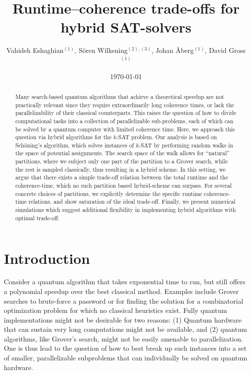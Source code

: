 \documentclass[a4paper,aps,floatfix]{revtex4}
\begin{document}
\title{Runtime--coherence trade-offs for hybrid SAT-solvers}


\author{
	Vahideh Eshaghian$^{(1)}$, 
S\"oren Wilkening$^{(2), (3)}$, Johan {\AA}berg$^{(1)}$, David Gross$^{(1)}$
}



\date{\today}


\begin{abstract}
	Many search-based quantum algorithms that achieve a theoretical speedup are not practically relevant since they require extraordinarily long coherence times, or lack the parallelizability of their classical counterparts. 
	This raises the question of how to divide computational tasks into  a collection of parallelizable sub-problems, each of which can be solved by a quantum computer with limited coherence time. 
	Here, we approach this question via hybrid algorithms for the $k$-SAT problem. 
	Our analysis is based on Sch\"oning's algorithm, which solves instances of $k$-SAT by performing random walks in the space of potential assignments. 
	The search space of the walk allows for ``natural'' partitions, where we subject only one part of the partition to a Grover search, while the rest is sampled classically, thus resulting in a hybrid scheme. 
	In this setting, we argue that there exists a simple trade-off relation between the total runtime and the coherence-time, which no such partition based hybrid-scheme can surpass. 
	For several concrete choices of partitions, we explicitly determine the specific runtime coherence-time relations, and show saturation of the ideal trade-off. 
	Finally, we present numerical simulations which suggest additional flexibility in implementing hybrid algorithms with optimal trade-off.  
\end{abstract}



\maketitle

\section{Introduction}

Consider a quantum algorithm that takes exponential time to run, but still offers a polynomial speedup over the best classical method.
Examples include Grover searches to brute-force a password or for finding the solution  for a combinatorial optimization problem for which no classical heuristics exist.
Fully quantum implementations might not be desirable for two reasons:
(1) Quantum hardware that can sustain very long computations might not be available,
and
(2) quantum algorithms, like Grover's search, might not be easily amenable to parallelization.
One is thus lead to the question of how to best break up such instances into a set of smaller, parallelizable subproblems that can individually be solved on quantum hardware.
\end{document}
